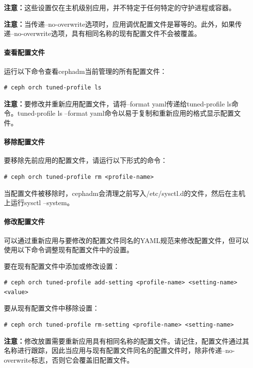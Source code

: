 \documentclass[12pt,UTF8]{ctexbook}
\begin{document}
\textbf{注意：}这些设置仅在主机级别应用，并不特定于任何特定的守护进程或容器。

\textbf{注意：}当传递--no-overwrite选项时，应用调优配置文件是幂等的。此外，如果传递--no-overwrite选项，具有相同名称的现有配置文件不会被覆盖。

\paragraph{查看配置文件}

运行以下命令查看cephadm当前管理的所有配置文件：
\begin{verbatim}
# ceph orch tuned-profile ls
\end{verbatim}

\textbf{注意：}要修改并重新应用配置文件，请将--format yaml传递给tuned-profile ls命令。tuned-profile ls --format yaml命令以易于复制和重新应用的格式显示配置文件。

\paragraph{移除配置文件}

要移除先前应用的配置文件，请运行以下形式的命令：
\begin{verbatim}
# ceph orch tuned-profile rm <profile-name>
\end{verbatim}

当配置文件被移除时，cephadm会清理之前写入/etc/sysctl.d的文件，然后在主机上运行sysctl --system。

\paragraph{修改配置文件}

可以通过重新应用与要修改的配置文件同名的YAML规范来修改配置文件，但可以使用以下命令调整现有配置文件中的设置。

要在现有配置文件中添加或修改设置：
\begin{verbatim}
# ceph orch tuned-profile add-setting <profile-name> <setting-name> <value>
\end{verbatim}

要从现有配置文件中移除设置：
\begin{verbatim}
# ceph orch tuned-profile rm-setting <profile-name> <setting-name>
\end{verbatim}

\textbf{注意：}修改放置需要重新应用具有相同名称的配置文件。请记住，配置文件通过其名称进行跟踪，因此当应用与现有配置文件同名的配置文件时，除非传递--no-overwrite标志，否则它会覆盖旧配置文件。
\end{document}
